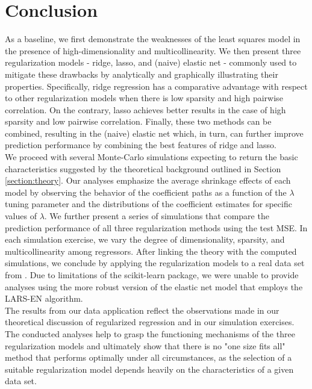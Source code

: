 \section{Conclusion}
\label{section:conclusion}

\noindent As a baseline, we first demonstrate the weaknesses of the least squares model in the presence of high-dimensionality and multicollinearity. We then  present three regularization models - ridge, lasso, and (naive) elastic net - commonly used to mitigate these drawbacks by analytically and graphically illustrating their properties. Specifically, ridge regression has a comparative advantage with respect to other regularization models when there is low sparsity and high pairwise correlation. On the contrary, lasso achieves better results in the case of high sparsity and low pairwise correlation. Finally, these two methods can be combined, resulting in the (naive) elastic net which, in turn, can further improve prediction performance by combining the best features of ridge and lasso. %
\\

\noindent We proceed with several Monte-Carlo simulations expecting to return the basic characteristics suggested by the theoretical background outlined in Section \ref{section:theory}. Our analyses emphasize the average shrinkage effects of each model by observing the behavior of the coefficient paths as a function of the $\lambda$ tuning parameter and the distributions of the coefficient estimates for specific values of $\lambda$. We further present a series of simulations that compare the prediction performance of all three regularization methods using the test MSE. In each simulation exercise, we vary the degree of dimensionality, sparsity, and multicollinearity among regressors. After linking the theory with the computed simulations, we conclude by applying the regularization models to a real data set from \citet{stamey1989prostate}. Due to limitations of the scikit-learn package, we were unable to provide analyses using the more robust version of the elastic net model that employs the LARS-EN algorithm.    \\

\noindent The results from our data application reflect the observations made in our theoretical discussion of regularized regression and in our simulation exercises. The conducted analyses help to grasp the functioning mechanisms of the three regularization models and ultimately show that there is no "one size fits all" method that performs optimally under all circumstances, as the selection of a suitable regularization model depends heavily on the characteristics of a given data set.\\



